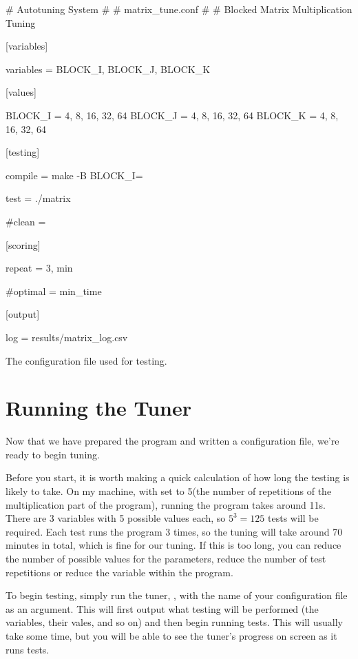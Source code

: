 \documentclass[a4paper]{article}
\begin{document}
\begin{listing}[h]
\begin{Code}[label=\codelabel{matrix\_tune.conf}]
# Autotuning System
#
# matrix_tune.conf
#
# Blocked Matrix Multiplication Tuning

[variables]

variables = BLOCK_I, BLOCK_J, BLOCK_K


[values]

BLOCK_I = 4, 8, 16, 32, 64
BLOCK_J = 4, 8, 16, 32, 64
BLOCK_K = 4, 8, 16, 32, 64


[testing]

compile = make -B BLOCK_I=%

test = ./matrix

#clean = 


[scoring]

repeat = 3, min

#optimal = min_time


[output]

log = results/matrix_log.csv
\end{Code}

\caption{The configuration file used for testing.}
\label{code:conf-file}
\end{listing}




\clearpage

\section{Running the Tuner}
Now that we have prepared the program and written a configuration file, we're 
ready to begin tuning. 

Before you start, it is worth making a quick calculation 
of how long the testing is likely to take. On my machine, with  
set to 5(the number of repetitions of the multiplication part of the program),
running the program takes around 11s. There are 3 variables 
with 5 possible values each, so $5^3 = 125$ tests will be required. Each test 
runs the program 3 times, so the tuning will take around 70 minutes in total, 
which is fine for our tuning. If this is too long, you can reduce 
the number of possible values for the parameters, reduce the number of test 
repetitions or reduce the  variable within the program.

To begin testing, simply run the tuner, 
, with the name of 
your configuration file as an argument. This will first output what testing 
will be performed (the variables, their vales, and so on) and then begin 
running tests. This will usually take some time, but you will be able to see 
the tuner's progress on screen as it runs tests.
\end{document}
